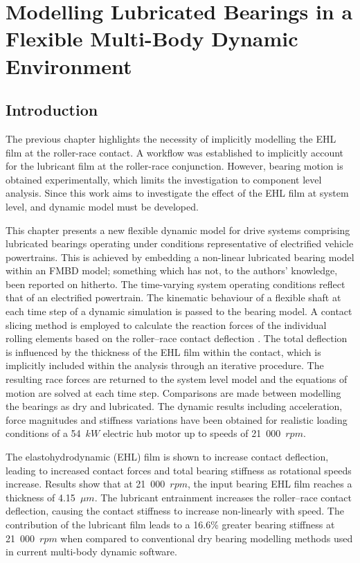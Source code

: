 \chapter{Modelling Lubricated Bearings in a Flexible Multi-Body Dynamic Environment}
\label{Lubricated FMBD}

\section{Introduction}
The previous chapter highlights the necessity of implicitly modelling the EHL film at the roller-race contact. A workflow was established to implicitly account for the lubricant film at the roller-race conjunction. However, bearing motion is obtained experimentally, which limits the investigation to component level analysis. Since this work aims to investigate the effect of the EHL film at system level, and dynamic model must be developed.

This chapter presents a new flexible dynamic model for drive systems comprising lubricated bearings operating under conditions representative of electrified vehicle powertrains. This is achieved by embedding a non-linear lubricated bearing model within an FMBD model; something which has not, to the authors’ knowledge, been reported on hitherto. The time-varying system operating conditions reflect that of an electrified powertrain. The kinematic behaviour of a flexible shaft at each time step of a dynamic simulation is passed to the bearing model. A contact slicing method \cite{Andreason1973} is employed to calculate the reaction forces of the individual rolling elements based on the roller–race contact deflection \cite{Lundberg1949}. The total deflection is influenced by the thickness of the EHL film within the contact, which is implicitly included within the analysis through an iterative procedure. The resulting race forces are returned to the system level model and the equations of motion are solved at each time step. Comparisons are made between modelling the bearings as dry and lubricated. The dynamic results including acceleration, force magnitudes and stiffness variations have been obtained for realistic loading conditions of a 54~$kW$ electric hub motor up to speeds of 21~000~$rpm$.

The elastohydrodynamic (EHL) film is shown to increase contact deflection, leading to increased contact forces and total bearing stiffness as rotational speeds increase. Results show that at 21~000~$rpm$, the input bearing EHL film reaches a thickness of 4.15~$\mu m$. The lubricant entrainment increases the roller–race contact deflection, causing the contact stiffness to increase non-linearly with speed. The contribution of the lubricant film leads to a 16.6\% greater bearing stiffness at 21~000~$rpm$ when compared to conventional dry bearing modelling methods used in current multi-body dynamic software.

